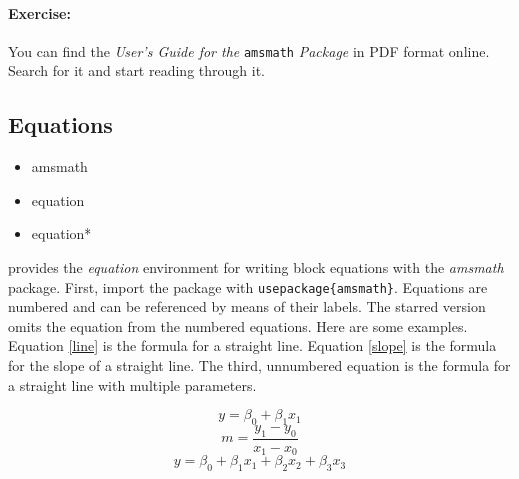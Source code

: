 		\paragraph{Exercise:} You can find the \textit{User's Guide for the }\texttt{amsmath} \textit{Package} in PDF format online. Search for it and start reading through it.

        \subsection{Equations}
        \label{Equations}
        
        \begin{cmd}
            \begin{itemize}
                \item{amsmath}
                \item{equation}
                \item{equation*}
            \end{itemize}
        \end{cmd}
	
		\Lx{} provides the \textit{equation} environment for writing block equations with the \textit{amsmath} package. First, import the package with \texttt{usepackage\{amsmath\}}.  Equations are numbered and can be referenced by means of their labels. The starred version omits the equation from the numbered equations. Here are some examples. Equation \ref{line} is the formula for a straight line. Equation \ref{slope} is the formula for the slope of a straight line.  The third, unnumbered equation is the formula for a straight line with multiple parameters.

        \begin{sample}
		\begin{equation}
			\label{line}
			y = \beta_0 + \beta_1 x_1
		\end{equation}
		\begin{equation}
			\label{slope}
			m = \frac{y_1 - y_0}{x_1 - x_0}
		\end{equation}
		\begin{equation*}
			y = \beta_0 + \beta_1 x_1 + \beta_2 x_2 + \beta_3 x_3
		\end{equation*}
        \end{sample}

